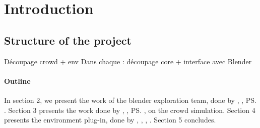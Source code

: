 \section{Introduction}



\subsection{Structure of the project}

Découpage crowd + env
Dans chaque : découpage core + interface avec Blender



\paragraph{Outline}

In section 2, we present the work of the blender exploration team, done by \me, \mr, \ps. Section 3 presents the work done by \dl, \vl, \ps, \js on the crowd simulation. Section 4 presents the environment plug-in, done by \bb, \gc, \mr, \me. Section 5 concludes.